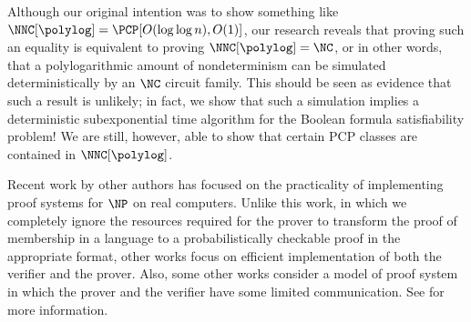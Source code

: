 %
%
%
Although our original intention was to show something like $\NNC[\polylog] = \PCP[O(\loglog n), O(1)]$, our research reveals that proving such an equality is equivalent to proving $\NNC[\polylog] = \NC$, or in other words, that a polylogarithmic amount of nondeterminism can be simulated deterministically by an $\NC$ circuit family.
This should be seen as evidence that such a result is unlikely; in fact, we show that such a simulation implies a deterministic subexponential time algorithm for the Boolean formula satisfiability problem!
We are still, however, able to show that certain PCP classes are contained in $\NNC[\polylog]$.

%
%
Recent work by other authors has focused on the practicality of implementing proof systems for $\NP$ on real computers.
Unlike this work, in which we completely ignore the resources required for the prover to transform the proof of membership in a language to a probabilistically checkable proof in the appropriate format, other works focus on efficient implementation of both the verifier and the prover.
Also, some other works consider a model of proof system in which the prover and the verifier have some limited communication.
See \autocites{bcgt13}{gkr08}{smbw12}{svpbbw12}{trmp12} for more information.


